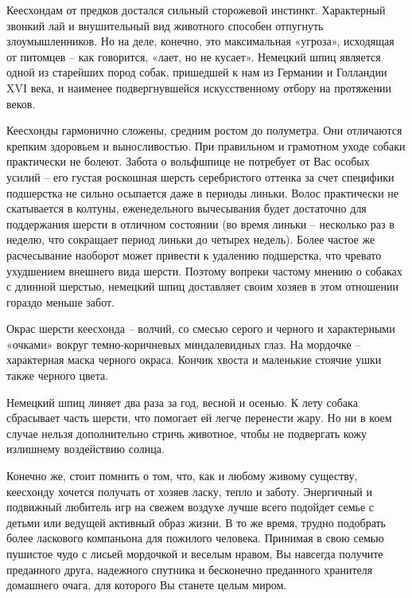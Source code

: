 \documentclass{article}
\begin{document}
  Кеесхондам от предков достался сильный сторожевой
  инстинкт. Характерный звонкий лай и внушительный вид животного
  способен отпугнуть злоумышленников. Но на деле, конечно, это
  максимальная «угроза», исходящая от питомцев – как говорится,
  «лает, но не кусает». Немецкий шпиц является одной из старейших
  пород собак, пришедшей к нам из Германии и Голландии XVI века, и
  наименее подвергнувшейся искусственному отбору на протяжении
  веков.

  Кеесхонды гармонично сложены, средним ростом до полуметра. Они
  отличаются крепким здоровьем и выносливостью. При правильном
  и грамотном уходе собаки практически не болеют. Забота о
  вольфшпице не потребует от Вас особых усилий – его густая
  роскошная шерсть серебристого оттенка за счет специфики
  подшерстка не сильно осыпается даже в периоды линьки. Волос
  практически не скатывается в колтуны, еженедельного
  вычесывания будет достаточно для поддержания шерсти в
  отличном состоянии (во время линьки – несколько раз в неделю,
  что сокращает период линьки до четырех недель). Более частое же
  расчесывание наоборот может привести к удалению подшерстка,
  что чревато ухудшением внешнего вида шерсти. Поэтому вопреки
  частому мнению о собаках с длинной шерстью, немецкий шпиц
  доставляет своим хозяев в этом отношении гораздо меньше забот.

  Окрас шерсти кеесхонда – волчий, со смесью серого и черного и
  характерными «очками» вокруг темно-коричневых миндалевидных
  глаз. На мордочке – характерная маска черного окраса. Кончик
  хвоста и маленькие стоячие ушки также черного цвета.

  Немецкий шпиц линяет два раза за год, весной и осенью. К лету
  собака сбрасывает часть шерсти, что помогает ей легче перенести
  жару. Но ни в коем случае нельзя дополнительно стричь животное,
  чтобы не подвергать кожу излишнему воздействию солнца.

  Конечно же, стоит помнить о том, что, как и любому живому
  существу, кеесхонду хочется получать от хозяев ласку, тепло и
  заботу. Энергичный и подвижный любитель игр на свежем воздухе
  лучше всего подойдет семье с детьми или ведущей активный
  образ жизни. В то же время, трудно подобрать более ласкового
  компаньона для пожилого человека. Принимая в свою семью
  пушистое чудо с лисьей мордочкой и веселым нравом, Вы навсегда
  получите преданного друга, надежного спутника и бесконечно
  преданного хранителя домашнего очага, для которого Вы станете
  целым миром.
\end{document}
